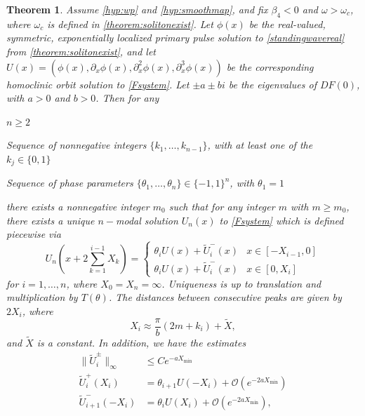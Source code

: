 \documentclass[12pt]{elsarticle}
\newtheorem{theorem}{Theorem}
\begin{document}
\begin{theorem}\label{theorem:multiexist}
Assume \cref{hyp:wp} and \cref{hyp:smoothmap}, and fix $\beta_4 < 0$ and $\omega > \omega_c$, where $\omega_c$ is defined in \cref{theorem:solitonexist}. Let $\phi(x)$ be the real-valued, symmetric, exponentially localized primary pulse solution to \cref{standingwavereal} from \cref{theorem:solitonexist}, and let $U(x) = (\phi(x), \partial_x \phi(x), \partial_x^2 \phi(x), \partial_x^3 \phi(x))$ be the corresponding homoclinic orbit solution to \cref{Fsystem}. Let $\pm a \pm bi$ be the eigenvalues of $DF(0)$, with $a > 0$ and $b > 0$. Then for any 
\begin{compactenum}[(i)]
\item $n \geq 2$
\item Sequence of nonnegative integers $\{ k_1, \dots, k_{n-1} \}$, with at least one of the $k_j \in \{0, 1 \}$
\item Sequence of phase parameters $\{ \theta_1, \dots, \theta_n \} \in \{-1, 1 \}^n$, with $\theta_1 = 1$
\end{compactenum}
there exists a nonnegative integer $m_0$ such that for any integer $m$ with $m \geq m_0$, there exists a unique $n-$modal solution $U_n(x)$ to \cref{Fsystem} which is defined piecewise via
\begin{equation}\label{Unpiecewise}
U_n\left( x + 2 \sum_{k=1}^{i-1} X_k \right) = \begin{cases} 
\theta_i U(x) + \tilde{U}_i^-(x) & x \in [-X_{i-1}, 0] \\
\theta_i U(x) + \tilde{U}_i^-(x) & x \in [0, X_i]
\end{cases}
\end{equation}
for $i = 1, \dots, n$, where $X_0 = X_n = \infty$. Uniqueness is up to translation and multiplication by $T(\theta)$. The distances between consecutive peaks are given by $2 X_i$, where
\begin{equation}\label{pulsedistances}
X_i \approx \frac{\pi}{b}(2 m + k_i) + \tilde{X},
\end{equation}
and $\tilde{X}$ is a constant. In addition, we have the estimates
\begin{equation}\label{Unestimates}
\begin{aligned}
\|\tilde{U}_i^\pm\|_\infty &\leq C e^{-a X_{\mathrm{min}}} \\
\tilde{U}_i^+(X_i) &= \theta_{i+1} U(-X_i) + \mathcal{O}(e^{-2 a X_{\min}}) \\
\tilde{U}_{i+1}^-(-X_i) &= \theta_i U(X_i) + \mathcal{O}(e^{-2 a X_{\min}}),

\end{aligned}
\end{equation}
\end{theorem}
\end{document}
